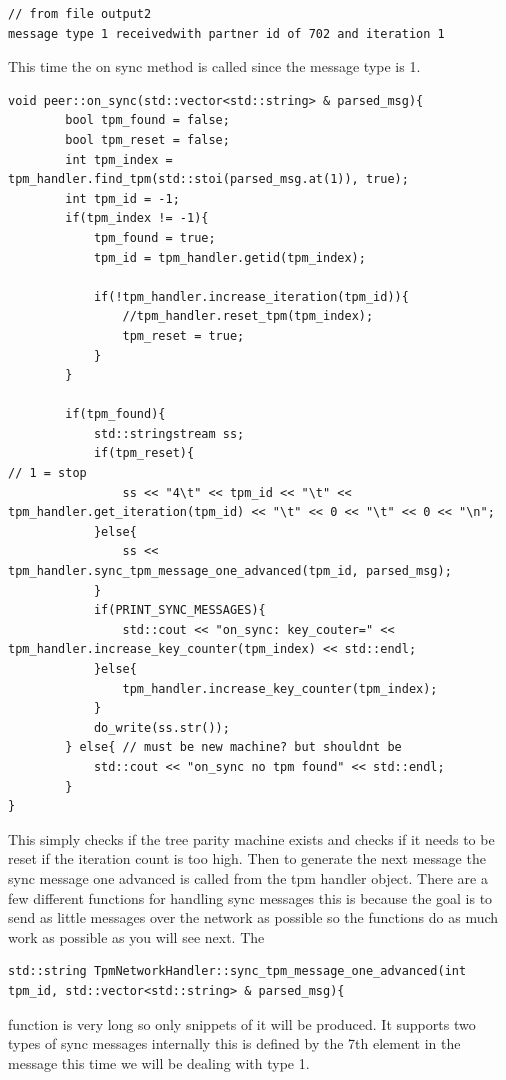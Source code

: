 \begin{lstlisting}
// from file output2
message type 1 receivedwith partner id of 702 and iteration 1
\end{lstlisting}

This time the on sync method is called since the message type is 1.
\begin{lstlisting}
void peer::on_sync(std::vector<std::string> & parsed_msg){
		bool tpm_found = false;
		bool tpm_reset = false;
		int tpm_index = tpm_handler.find_tpm(std::stoi(parsed_msg.at(1)), true);
		int tpm_id = -1;
		if(tpm_index != -1){
			tpm_found = true;
			tpm_id = tpm_handler.getid(tpm_index);
			
			if(!tpm_handler.increase_iteration(tpm_id)){
				//tpm_handler.reset_tpm(tpm_index);
				tpm_reset = true;
			}
		}
		
		if(tpm_found){
			std::stringstream ss;
			if(tpm_reset){                                                                     // 1 = stop 
				ss << "4\t" << tpm_id << "\t" << tpm_handler.get_iteration(tpm_id) << "\t" << 0 << "\t" << 0 << "\n";
			}else{
				ss << tpm_handler.sync_tpm_message_one_advanced(tpm_id, parsed_msg);
			}
			if(PRINT_SYNC_MESSAGES){
				std::cout << "on_sync: key_couter=" << tpm_handler.increase_key_counter(tpm_index) << std::endl;
			}else{
				tpm_handler.increase_key_counter(tpm_index);
			}
			do_write(ss.str());
		} else{ // must be new machine? but shouldnt be	
			std::cout << "on_sync no tpm found" << std::endl;
		}
}
\end{lstlisting}
This simply checks if the tree parity machine exists and checks if it needs to be reset if the iteration count is too high. Then to generate the next message the sync message one advanced is called from the tpm handler object. There are a few different functions for handling sync messages this is because the goal is to send as little messages over the network as possible so the functions do as much work as possible as you will see next.
The
\begin{lstlisting}
std::string TpmNetworkHandler::sync_tpm_message_one_advanced(int tpm_id, std::vector<std::string> & parsed_msg){
\end{lstlisting}
function is very long so only snippets of it will be produced. It supports two types of sync messages internally this is defined by the 7th element in the message this time we will be dealing with type 1.
